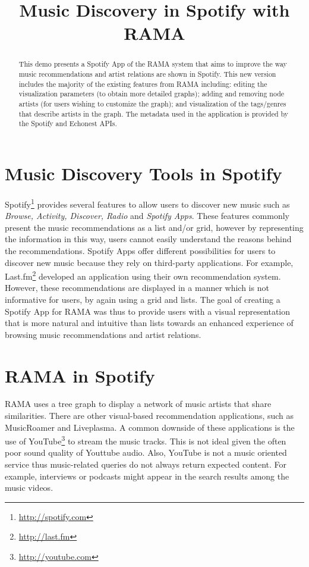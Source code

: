\documentclass{article}
\title{Music Discovery in Spotify with RAMA}
\begin{document}
\maketitle

\begin{abstract}
  This demo presents a Spotify App of the RAMA system that aims to improve the way music recommendations and artist relations are shown in Spotify.  This new version includes the majority of the existing features from RAMA including: editing the visualization parameters (to obtain more detailed graphs); adding and removing node artists (for users wishing to customize the graph); and visualization of the tags/genres that describe artists in the graph.
  The metadata used in the application is provided by the Spotify and Echonest APIs.
\end{abstract}

  \section{Music Discovery Tools in Spotify}
  \label{sec:spotify_tools}

    Spotify\footnote{\url{http://spotify.com}} provides several features to allow users to discover new music such as \textit{Browse, Activity, Discover, Radio} and \textit{Spotify Apps}.
    These features commonly present the music recommendations as a list and/or grid, however by representing the information in this way, users cannot easily understand the reasons behind the recommendations. 
    Spotify Apps\cite{spotifyapps} offer different possibilities for users to discover new music because they rely on third-party applications. For example, Last.fm\footnote{\url{http://last.fm}} developed an application\cite{lastfmspotifyapp} using their own recommendation system.
    However, these recommendations are displayed in a manner which is not informative for users, by again using a grid and lists. 
    The goal of creating a Spotify App for RAMA\cite{Gouyon2011} was thus to provide users with a visual representation that is more natural and intuitive than lists towards an enhanced experience of browsing music recommendations and artist relations. 

  \section{RAMA in Spotify}
  \label{sec:rama}
    \sloppy
    RAMA uses a tree graph to display a network of music artists that share similarities.
    There are other visual-based recommendation applications, such as MusicRoamer\cite{musicroamer} and Liveplasma\cite{liveplasma}. A common downside of these applications is the use of YouTube\footnote{\url{http://youtube.com}} to stream the music tracks.
    This is not ideal given the often poor sound quality of Youttube audio. Also, YouTube is not a music oriented service thus music-related queries do not always return expected content. For example, interviews or podcasts might appear in the search results among the music videos.
\end{document}
